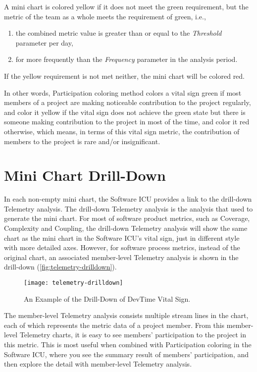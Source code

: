A mini chart is colored yellow if it does not meet the green requirement, but the metric of the team as a whole meets the requirement of green, i.e., 
\begin{enumerate}
\item the combined metric value is greater than or equal to the {\it Threshold} parameter per day,
\item for more frequently than the {\it Frequency} parameter in the analysis period.
\end{enumerate}

If the yellow requirement is not met neither, the mini chart will be colored red.

In other words, Participation coloring method colors a vital sign green if most members of a project are making noticeable contribution to the project regularly, and color it yellow if the vital sign does not achieve the green state but there is someone making contribution to the project in most of the time, and color it red otherwise, which means, in terms of this vital sign metric, the contribution of members to the project is rare and/or insignificant.

\section{Mini Chart Drill-Down}
\label{drilldown}
In each non-empty mini chart, the Software ICU provides a link to the drill-down Telemetry analysis. The drill-down Telemetry analysis is the analysis that used to generate the mini chart. For most of software product metrics, such as Coverage, Complexity and Coupling, the drill-down Telemetry analysis will show the same chart as the mini chart in the Software ICU's vital sign, just in different style with more detailed axes. However, for software process metrics, instead of the original chart, an associated member-level Telemetry analysis is shown in the drill-down (\autoref{fig:telemetry-drilldown}). 

\begin{figure}[htbp]
   \centering
   \texttt{[image: telemetry-drilldown]}
   \caption{An Example of the Drill-Down of DevTime Vital Sign.}
   \label{fig:telemetry-drilldown}
\end{figure}

The member-level Telemetry analysis consists multiple stream lines in the chart, each of which represents the metric data of a project member. From this member-level Telemetry charts, it is easy to see members' participation to the project in this metric. This is most useful when combined with Participation coloring in the Software ICU, where you see the summary result of members' participation, and then explore the detail with member-level Telemetry analysis.

